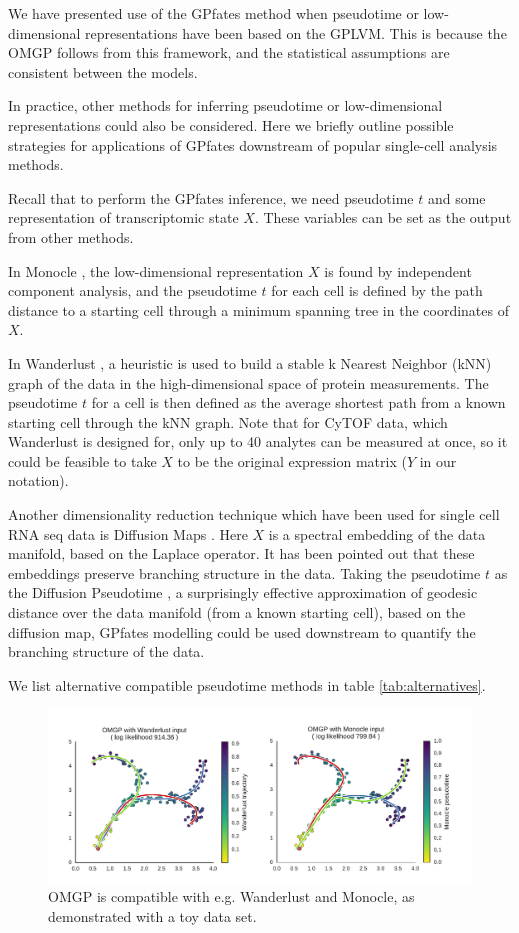 We have presented use of the GPfates method when pseudotime or low-dimensional representations have been based on the GPLVM. This is because the OMGP follows from this framework, and the statistical assumptions are consistent between the models.

In practice, other methods for inferring pseudotime or low-dimensional representations could also be considered. Here we briefly outline possible strategies for applications of GPfates downstream of popular single-cell analysis methods.

Recall that to perform the GPfates inference, we need pseudotime $ t $ and some representation of transcriptomic state $ X $. These variables can be set as the output from other methods.

In Monocle \cite{Trapnell2014-cn}, the low-dimensional representation $ X $ is found by independent component analysis, and the pseudotime $ t $ for each cell is defined by the path distance to a starting cell through a minimum spanning tree in the coordinates of $ X $.

In Wanderlust \cite{Bendall2014-kg}, a heuristic is used to build a stable k Nearest Neighbor (kNN) graph of the data in the high-dimensional space of protein measurements. The pseudotime $ t $ for a cell is then defined as the average shortest path from a known starting cell through the kNN graph. Note that for CyTOF data, which Wanderlust is designed for, only up to 40 analytes can be measured at once, so it could be feasible to take $ X $ to be the original expression matrix ($ Y $ in our notation).

Another dimensionality reduction technique which have been used for single cell RNA seq data is Diffusion Maps \cite{Haghverdi2015-ig}. Here $ X $ is a spectral embedding of the  data manifold, based on the Laplace operator. It has been pointed out that these embeddings preserve branching structure in the data. Taking the pseudotime $ t $ as the Diffusion Pseudotime \cite{Haghverdi2016-tm}, a surprisingly effective approximation of geodesic distance over the data manifold (from a known starting cell), based on the diffusion map, GPfates modelling could be used downstream to quantify the branching structure of the data.

We list alternative compatible pseudotime methods in table \ref{tab:alternatives}.

\begin{figure}
    \centering
    \includegraphics[width=\textwidth]{"fig-compatibility"}
    \caption[OMGP Compatibility]{OMGP is compatible with e.g. Wanderlust and Monocle, as demonstrated with a toy data set.}
    \label{fig:compatibility}
\end{figure}

